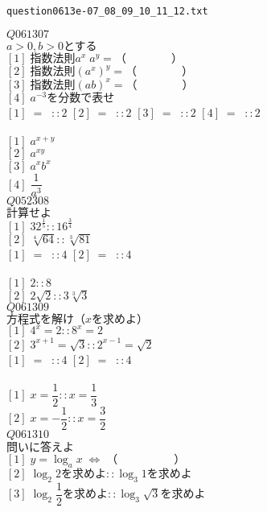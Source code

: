 \documentclass[10pt,dvipdfmx]{jarticle}
\begin{document}
\begin{center}
\verb|question0613e-07_08_09_10_11_12.txt|\\
\end{center}
$Q061307$\\
$a>0,b>0\text{とする}$\\
$[1]\;\text{指数法則}a^x\;a^y=\text{（　　　　）}$\\
$[2]\;\text{指数法則}(a^x)^y=\text{（　　　　）}$\\
$[3]\;\text{指数法則}(ab)^x=\text{（　　　　）}$\\
$[4]\;a^{-3}\text{を分数で表せ}$\\
$[1]\;=\;\;::2$ 
$[2]\;=\;\;::2$ 
$[3]\;=\;\;::2$ 
$[4]\;=\;\;::2$ 
\\
\\
$[1]\;a^{x+y}$\\
$[2]\;a^{xy}$\\
$[3]\;a^xb^x$\\
$[4]\;\dfrac{1}{a^3}$\\
$Q052308$\\
$\text{計算せよ}$\\
$[1]\;32^{\frac{1}{5}}::16^{\frac{3}{4}}$\\
$[2]\;\sqrt[4]{64}::\sqrt[3]{81}$\\
$[1]\;=\;\;::4$ 
$[2]\;=\;\;::4$ 
\\
\\
$[1]\;2::8$\\
$[2]\;2\sqrt{2}::3\sqrt[3]{3}$\\
$Q061309$\\
$\text{方程式を解け（}x\text{を求めよ）}$\\
$[1]\;4^x=2::8^x=2$\\
$[2]\;3^{x+1}=\sqrt{3}::2^{x-1}=\sqrt{2}$\\
$[1]\;=\;\;::4$ 
$[2]\;=\;\;::4$ 
\\
\\
$[1]\;x=\dfrac{1}{2}::x=\dfrac{1}{3}$\\
$[2]\;x=-\dfrac{1}{2}::x=\dfrac{3}{2}$\\
$Q061310$\\
$\text{問いに答えよ}$\\
$[1]\;y=\log_{a} x\;{\Longleftrightarrow}\;\text{（　　　　　）}$\\
$[2]\;\log_{2} 2\text{を求めよ}::\log_{3} 1\text{を求めよ}$\\
$[3]\;\log_{2} \dfrac{1}{2}\text{を求めよ}::\log_{3} \sqrt{3}\text{を求めよ}$\\
\end{document}
